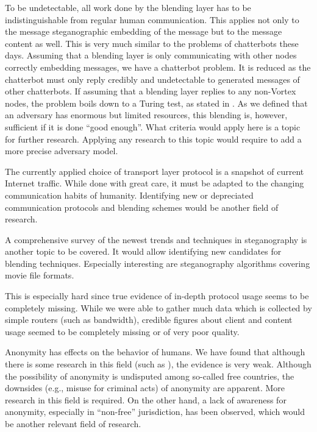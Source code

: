 To be undetectable, all work done by the blending layer has to be indistinguishable from regular human communication. This applies not only to the message steganographic embedding of the message but to the message content as well. This is very much similar to the problems of chatterbots these days. Assuming that a blending layer is only communicating with other nodes correctly embedding messages, we have a chatterbot problem. It is reduced as the chatterbot must only reply credibly and undetectable to generated messages of other chatterbots. If assuming that a blending layer replies to any non-Vortex nodes, the problem boils down to a Turing test, as stated in \cite{turing1950computing}. As we defined that an adversary has enormous but limited resources, this blending is, however, sufficient if it is done ``good enough''. What criteria would apply here is a topic for further research. Applying any research to this topic would require to add a more precise adversary model.

The currently applied choice of transport layer protocol is a snapshot of current Internet traffic. While done with great care, it must be adapted to the changing communication habits of humanity. Identifying new or depreciated communication protocols and blending schemes would be another field of research.

A comprehensive survey of the newest trends and techniques in steganography is another topic to be covered. It would allow identifying new candidates for blending techniques. Especially interesting are steganography algorithms covering movie file formats.

This is especially hard since true evidence of in-depth protocol usage seems to be completely missing. While we were able to gather much data which is collected by simple routers (such as bandwidth), credible figures about client and content usage seemed to be completely missing or of very poor quality.

Anonymity has effects on the behavior of humans. We have found that although there is some research in this field (such as \cite{postmes2001social}), the evidence is very weak. Although the possibility of anonymity is undisputed among so-called free countries, the downsides (e.g., misuse for criminal acts) of anonymity are apparent. More research in this field is required. On the other hand, a lack of awareness for anonymity, especially in ``non-free'' jurisdiction, has been observed, which would be another relevant field of research. 




